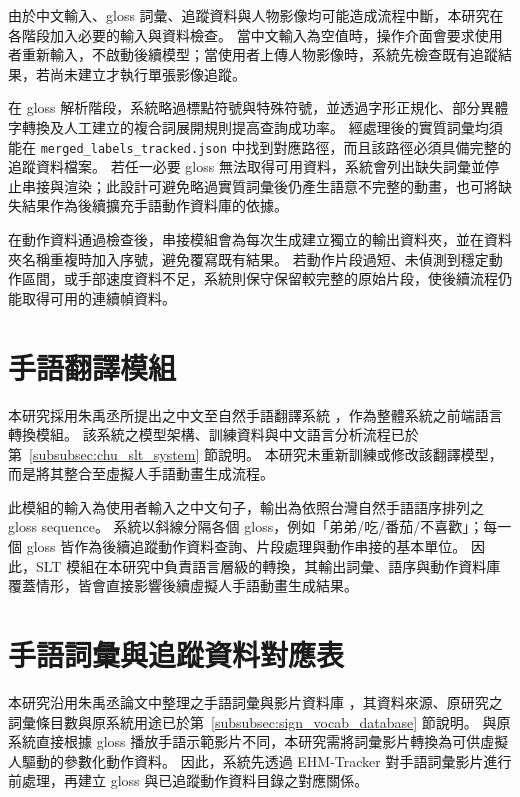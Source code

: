 \documentclass[class=NCU_thesis, crop=false]{standalone}
\begin{document}
由於中文輸入、gloss 詞彙、追蹤資料與人物影像均可能造成流程中斷，本研究在各階段加入必要的輸入與資料檢查。
當中文輸入為空值時，操作介面會要求使用者重新輸入，不啟動後續模型；當使用者上傳人物影像時，系統先檢查既有追蹤結果，若尚未建立才執行單張影像追蹤。

在 gloss 解析階段，系統略過標點符號與特殊符號，並透過字形正規化、部分異體字轉換及人工建立的複合詞展開規則提高查詢成功率。
經處理後的實質詞彙均須能在 \texttt{merged\_labels\_tracked.json} 中找到對應路徑，而且該路徑必須具備完整的追蹤資料檔案。
若任一必要 gloss 無法取得可用資料，系統會列出缺失詞彙並停止串接與渲染；此設計可避免略過實質詞彙後仍產生語意不完整的動畫，也可將缺失結果作為後續擴充手語動作資料庫的依據。

在動作資料通過檢查後，串接模組會為每次生成建立獨立的輸出資料夾，並在資料夾名稱重複時加入序號，避免覆寫既有結果。
若動作片段過短、未偵測到穩定動作區間，或手部速度資料不足，系統則保守保留較完整的原始片段，使後續流程仍能取得可用的連續幀資料。

\section{手語翻譯模組}
\label{sec:slt_module}

本研究採用朱禹丞所提出之中文至自然手語翻譯系統 \cite{Chu2025SLT}，作為整體系統之前端語言轉換模組。
該系統之模型架構、訓練資料與中文語言分析流程已於第~\ref{subsubsec:chu_slt_system} 節說明。
本研究未重新訓練或修改該翻譯模型，而是將其整合至虛擬人手語動畫生成流程。

此模組的輸入為使用者輸入之中文句子，輸出為依照台灣自然手語語序排列之 gloss sequence。
系統以斜線分隔各個 gloss，例如「弟弟/吃/番茄/不喜歡」；每一個 gloss 皆作為後續追蹤動作資料查詢、片段處理與動作串接的基本單位。
因此，SLT 模組在本研究中負責語言層級的轉換，其輸出詞彙、語序與動作資料庫覆蓋情形，皆會直接影響後續虛擬人手語動畫生成結果。

\section{手語詞彙與追蹤資料對應表}
\label{sec:sign_vocab_tracking_mapping}

本研究沿用朱禹丞論文中整理之手語詞彙與影片資料庫 \cite{Chu2025SLT}，其資料來源、原研究之詞彙條目數與原系統用途已於第~\ref{subsubsec:sign_vocab_database} 節說明。
與原系統直接根據 gloss 播放手語示範影片不同，本研究需將詞彙影片轉換為可供虛擬人驅動的參數化動作資料。
因此，系統先透過 EHM-Tracker 對手語詞彙影片進行前處理，再建立 gloss 與已追蹤動作資料目錄之對應關係。
\end{document}
